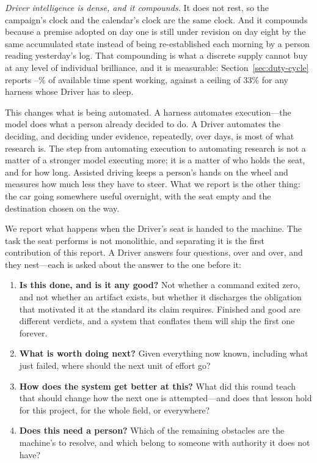 \emph{Driver intelligence is dense, and it compounds.} It does not rest, so the
campaign's clock and the calendar's clock are the same clock. And it compounds
because a premise adopted
on day one is still under revision on day eight by the same accumulated state instead
of being re-established each morning by a person reading yesterday's log. That
compounding is what a discrete supply cannot buy at any level of individual
brilliance, and it is measurable: Section~\ref{sec:duty-cycle} reports
\DutyCycleLow--\DutyCycleHigh\% of available time spent working, against a ceiling of
33\% for any harness whose Driver has to sleep.

This changes what is being automated. A harness automates execution---the model does
what a person already decided to do. A Driver automates the deciding, and deciding
under evidence, repeatedly, over days, is most of what research is. The step from
automating execution to automating research is not a matter of a stronger model
executing more; it is a matter of who holds the seat, and for how long. Assisted
driving keeps a person's hands on the wheel and measures how much less they have to
steer. What we report is the other thing: the car going somewhere useful overnight,
with the seat empty and the destination chosen on the way.

We report what happens when the Driver's seat is handed to the machine. The task the
seat performs is not monolithic, and separating it is the first contribution of this
report. A Driver answers four questions, over and over, and they nest---each is asked
about the answer to the one before it:

\begin{enumerate}[label=\textbf{Q\arabic*.}]
  \item \textbf{Is this done, and is it any good?} Not whether a command exited zero,
    and not whether an artifact exists, but whether it discharges the obligation that
    motivated it at the standard its claim requires. Finished and good are different
    verdicts, and a system that conflates them will ship the first one forever.
  \item \textbf{What is worth doing next?} Given everything now known, including
    what just failed, where should the next unit of effort go?
  \item \textbf{How does the system get better at this?} What did this round teach
    that should change how the next one is attempted---and does that lesson hold for
    this project, for the whole field, or everywhere?
  \item \textbf{Does this need a person?} Which of the remaining obstacles are the
    machine's to resolve, and which belong to someone with authority it does not
    have?
\end{enumerate}

